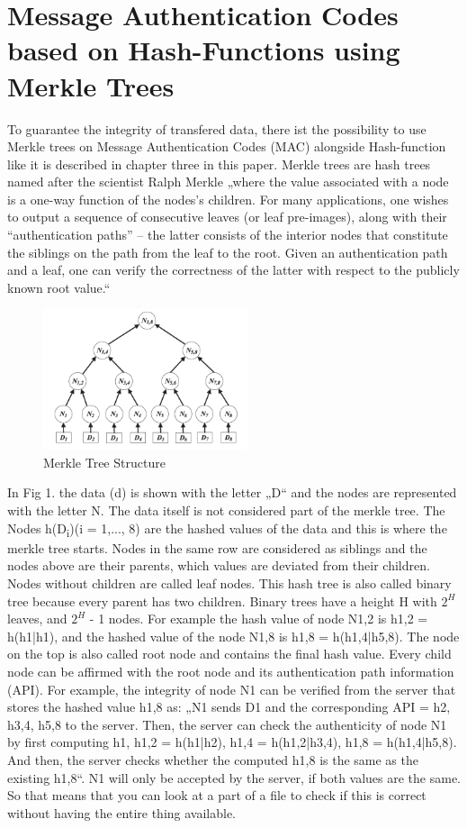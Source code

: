 \section{Message Authentication Codes based on Hash-Functions using Merkle Trees}

To guarantee the integrity of transfered data, there ist the possibility to use Merkle trees on Message Authentication Codes (MAC) alongside Hash-function like it is described in chapter three in this paper.  Merkle trees are hash trees named after the scientist Ralph Merkle „where the value associated with a node is a one-way function of the nodes’s children. For many applications, one wishes to output a sequence of consecutive leaves (or leaf pre-images), along with their “authentication paths” – the latter consists of the interior nodes that constitute the siblings on the path from the leaf to the root. Given an authentication path and a leaf, one can verify the correctness of the latter with respect to the publicly known root value.“ \cite{MT} 

\begin{figure}
\centering
\includegraphics[width=6cm]{Pages/Merkle/merkleTree.png}
\caption{Merkle Tree Structure}
\end{figure}

In Fig 1. the data (d) is shown with the letter „D“ and the nodes are represented with the letter N. The data itself is not considered part of the merkle tree. The Nodes h(D\textsubscript{i})(i = 1,..., 8) are the hashed values of the data and this is where the merkle tree starts. Nodes in the same row are considered as siblings and the nodes above are their parents, which values are deviated from their children. Nodes without children are called leaf nodes. This hash tree is also called binary tree because every parent has two children. Binary trees have a height H with $ 2^{H} $ leaves, and $  2^{H} $ - 1 nodes. \cite{MT} 
For example the hash value of node N1,2 is h1,2 = h(h1|h1), and the hashed value of the node N1,8 is h1,8 = h(h1,4|h5,8). \cite{METR} The node on the top is also called root node and contains the final hash value. Every child node can be affirmed with the root node and its authentication path information (API). For example, the integrity of node N1 can be verified from the server that stores the hashed value h1,8 as: „N1 sends D1 and the corresponding API = h2, h3,4, h5,8 to the server. Then, the server can check the authenticity of node N1 by first computing h1, h1,2 = h(h1|h2), h1,4 = h(h1,2|h3,4), h1,8 = h(h1,4|h5,8). And then, the server checks whether the computed h1,8 is the same as the existing h1,8“. \cite{METR} N1 will only be accepted by the server, if both values are the same. So that means that you can look at a part of a file to check if this is correct without having the entire thing available.

